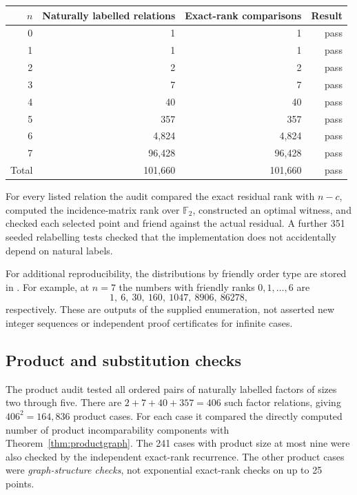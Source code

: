 \documentclass[11pt,a4paper]{article}
\theoremstyle{definition}
\theoremstyle{remark}
\newcommand{\F}{\mathbb{F}}
\begin{document}
\begin{center}
\begin{tabular}{@{}rrrr@{}}
\toprule
$n$ & Naturally labelled relations & Exact-rank comparisons & Result \\
\midrule
0 & 1 & 1 & pass\\
1 & 1 & 1 & pass\\
2 & 2 & 2 & pass\\
3 & 7 & 7 & pass\\
4 & 40 & 40 & pass\\
5 & 357 & 357 & pass\\
6 & 4,824 & 4,824 & pass\\
7 & 96,428 & 96,428 & pass\\
\midrule
Total & 101,660 & 101,660 & pass\\
\bottomrule
\end{tabular}
\end{center}

For every listed relation the audit compared the exact residual rank with
$n-c$, computed the incidence-matrix rank over $\F_2$, constructed an
optimal witness, and checked each selected point and friend against the
actual residual. A further 351 seeded relabelling tests checked that the
implementation does not accidentally depend on natural labels.

For additional reproducibility, the distributions by friendly order type
are stored in . For example, at $n=7$
the numbers with friendly ranks $0,1,\ldots,6$ are
\[
 1,\ 6,\ 30,\ 160,\ 1047,\ 8906,\ 86278,
\]
respectively. These are outputs of the supplied enumeration, not asserted
new integer sequences or independent proof certificates for infinite cases.

\subsection{Product and substitution checks}

The product audit tested all ordered pairs of naturally labelled factors
of sizes two through five. There are $2+7+40+357=406$ such factor
relations, giving $406^2=164{,}836$ product cases. For each case it compared
the directly computed number of product incomparability components with
Theorem~\ref{thm:productgraph}. The 241 cases with product size at most nine
were also checked by the independent exact-rank recurrence. The other
product cases were \emph{graph-structure checks}, not exponential exact-rank
checks on up to 25 points.
\end{document}
